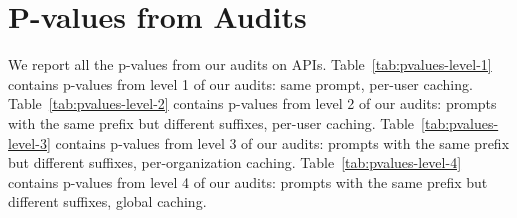 \section{P-values from Audits}
\label{app:audit-pvalues}

We report all the p-values from our audits on APIs. Table~\ref{tab:pvalues-level-1} contains p-values from level 1 of our audits: same prompt, per-user caching. Table~\ref{tab:pvalues-level-2} contains p-values from level 2 of our audits: prompts with the same prefix but different suffixes, per-user caching. Table~\ref{tab:pvalues-level-3} contains p-values from level 3 of our audits: prompts with the same prefix but different suffixes, per-organization caching. Table~\ref{tab:pvalues-level-4} contains p-values from level 4 of our audits: prompts with the same prefix but different suffixes, global caching.

